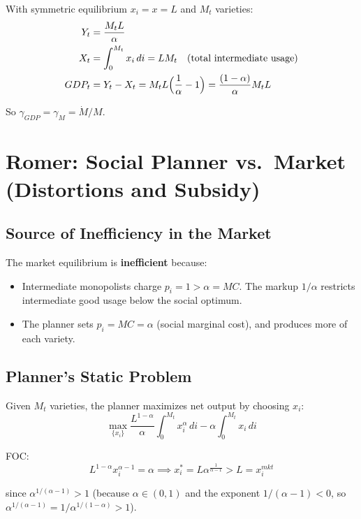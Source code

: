 \documentclass[a4paper,11pt]{article}
\begin{document}
With symmetric equilibrium $x_i = x = L$ and $M_t$ varieties:
\begin{align*}
Y_t &= \frac{M_t L}{\alpha} \\
X_t &= \int_0^{M_t} x_i \, di = L M_t \quad (\text{total intermediate usage}) \\
GDP_t &= Y_t - X_t = M_t L\Bigl(\frac{1}{\alpha} - 1\Bigr) = \frac{(1-\alpha)}{\alpha} M_t L
\end{align*}

So $\gamma_{GDP} = \gamma_M = \dot{M}/M$.

\clearpage

\section{Romer: Social Planner vs.\ Market (Distortions and Subsidy)}

\subsection*{Source of Inefficiency in the Market}

The market equilibrium is \textbf{inefficient} because:
\begin{itemize}
    \item Intermediate monopolists charge $p_i = 1 > \alpha = MC$. The markup $1/\alpha$ restricts intermediate good usage below the social optimum.
    \item The planner sets $p_i = MC = \alpha$ (social marginal cost), and produces more of each variety.
\end{itemize}

\subsection*{Planner's Static Problem}

Given $M_t$ varieties, the planner maximizes net output by choosing $x_i$:
\[
\max_{\{x_i\}} \frac{L^{1-\alpha}}{\alpha} \int_0^{M_t} x_i^\alpha \, di - \alpha \int_0^{M_t} x_i \, di
\]

FOC:
\[
L^{1-\alpha} x_i^{\alpha-1} = \alpha \implies x_i^* = L \alpha^{\frac{1}{\alpha-1}} > L = x_i^{mkt}
\]

since $\alpha^{1/(\alpha-1)} > 1$ (because $\alpha \in (0,1)$ and the exponent $1/(\alpha-1) < 0$, so $\alpha^{1/(\alpha-1)} = 1/\alpha^{1/(1-\alpha)} > 1$).
\end{document}
